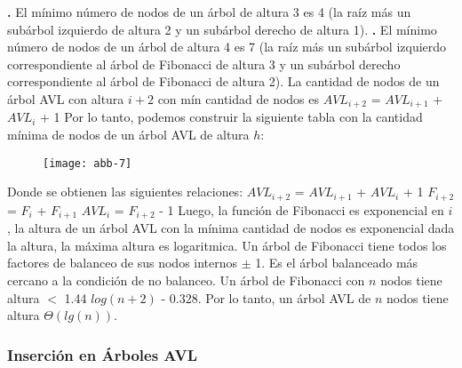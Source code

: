 \documentclass[10pt,a4paper]{article}
\begin{document}
\newline
\newline
\textbf{.} El mínimo número de nodos de un árbol de altura 3 es 4 (la raíz más un subárbol izquierdo de altura 2 y un subárbol derecho de altura 1).
\newline
\newline
\textbf{.} El mínimo número de nodos de un árbol de altura 4 es 7 (la raíz más un subárbol izquierdo correspondiente al árbol de Fibonacci de altura 3 y un subárbol derecho correspondiente al árbol de Fibonacci de altura 2).
\newline
\newline
La cantidad de nodos de un árbol AVL con altura $i+2$ con mín cantidad de nodos es $AVL_{i+2}$ = $AVL_{i+1}$ + $AVL_{i}$ + 1   
\newline
\newline
Por lo tanto, podemos construir la siguiente tabla con la cantidad mínima de nodos de un árbol AVL de altura $h$:

\begin{figure}[h]
	\centering
\texttt{[image: abb-7]}
	\label{drivers1}
\end{figure}
\newpage
Donde se obtienen las siguientes relaciones:
\newline
\newline
$AVL_{i+2}$ = $AVL_{i+1}$ + $AVL_{i}$ + 1
\newline
\newline
$F_{i+2}$ = $F_{i}$ + $F_{i+1}$ 
\newline
\newline
$AVL_{i}$ = $F_{i+2}$ - 1
\newline
\newline
Luego, la función de Fibonacci es exponencial en $i$, la altura de un árbol AVL con la mínima cantidad de nodos es exponencial dada la altura, la máxima altura es logaritmica.   
\newline
\newline
Un árbol de Fibonacci tiene todos los factores de balanceo de sus nodos internos $\pm$ 1. Es el árbol balanceado más cercano a la condición de no balanceo. 
\newline
\newline
Un árbol de Fibonacci con $n$ nodos tiene altura $<$ 1.44 $log(n+2)$ - 0.328. Por lo tanto, un árbol AVL de $n$ nodos tiene altura $\Theta(lg(n))$.

\subsubsection{Inserción en Árboles AVL}
\end{document}
